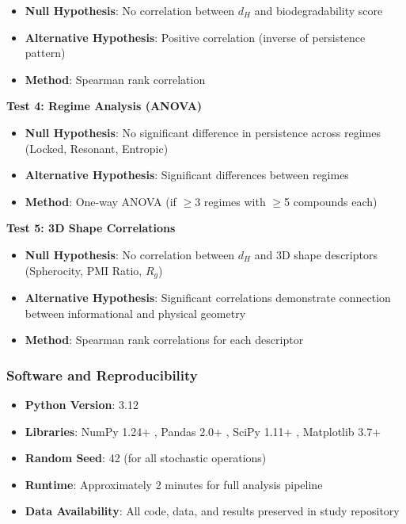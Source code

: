 \documentclass[11pt,letterpaper]{article}
\begin{document}
\begin{itemize}
    \item \textbf{Null Hypothesis}: No correlation between $d_H$ and biodegradability score
    \item \textbf{Alternative Hypothesis}: Positive correlation (inverse of persistence pattern)
    \item \textbf{Method}: Spearman rank correlation
\end{itemize}

\textbf{Test 4: Regime Analysis (ANOVA)}

\begin{itemize}
    \item \textbf{Null Hypothesis}: No significant difference in persistence across regimes (Locked, Resonant, Entropic)
    \item \textbf{Alternative Hypothesis}: Significant differences between regimes
    \item \textbf{Method}: One-way ANOVA (if $\geq$3 regimes with $\geq$5 compounds each)
\end{itemize}

\textbf{Test 5: 3D Shape Correlations}

\begin{itemize}
    \item \textbf{Null Hypothesis}: No correlation between $d_H$ and 3D shape descriptors (Spherocity, PMI Ratio, $R_g$)
    \item \textbf{Alternative Hypothesis}: Significant correlations demonstrate connection between informational and physical geometry
    \item \textbf{Method}: Spearman rank correlations for each descriptor
\end{itemize}

\subsubsection{Software and Reproducibility}

\begin{itemize}
    \item \textbf{Python Version}: 3.12
    \item \textbf{Libraries}: NumPy 1.24+ \cite{NumPy2020}, Pandas 2.0+ \cite{pandas2020}, SciPy 1.11+ \cite{SciPy2020}, Matplotlib 3.7+ \cite{Matplotlib2007}
    \item \textbf{Random Seed}: 42 (for all stochastic operations)
    \item \textbf{Runtime}: Approximately 2 minutes for full analysis pipeline
    \item \textbf{Data Availability}: All code, data, and results preserved in study repository
\end{itemize}
\end{document}

